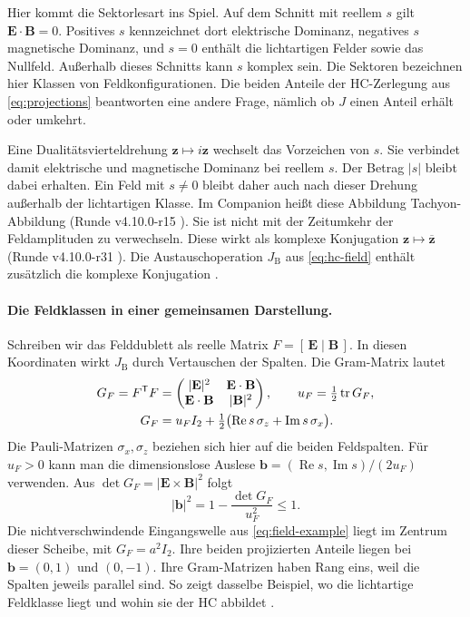 Hier kommt die Sektorlesart ins Spiel. Auf dem Schnitt mit reellem \(s\) gilt \(\mathbf E\cdot\mathbf B=0\). Positives \(s\) kennzeichnet dort elektrische Dominanz, negatives \(s\) magnetische Dominanz, und \(s=0\) enthält die lichtartigen Felder sowie das Nullfeld. Außerhalb dieses Schnitts kann \(s\) komplex sein. Die Sektoren bezeichnen hier Klassen von Feldkonfigurationen. Die beiden Anteile der HC-Zerlegung aus \eqref{eq:projections} beantworten eine andere Frage, nämlich ob \(J\) einen Anteil erhält oder umkehrt.

Eine Dualitätsvierteldrehung \(\mathbf z\mapsto i\mathbf z\) wechselt das Vorzeichen von \(s\). Sie verbindet damit elektrische und magnetische Dominanz bei reellem \(s\). Der Betrag \(|s|\) bleibt dabei erhalten. Ein Feld mit \(s\ne0\) bleibt daher auch nach dieser Drehung außerhalb der lichtartigen Klasse. Im Companion heißt diese Abbildung Tachyon-Abbildung (Runde v4.10.0-r15 \cite{companion}). Sie ist nicht mit der Zeitumkehr der Feldamplituden zu verwechseln. Diese wirkt als komplexe Konjugation \(\mathbf z\mapsto\overline{\mathbf z}\) (Runde v4.10.0-r31 \cite{layers}). Die Austauschoperation \(J_{\mathrm B}\) aus \eqref{eq:hc-field} enthält zusätzlich die komplexe Konjugation \cite{grundidee,feldsektoren}.

\paragraph{Die Feldklassen in einer gemeinsamen Darstellung.}
Schreiben wir das Felddublett als reelle Matrix \(F=[\,\mathbf E\mid\mathbf B\,]\). In diesen Koordinaten wirkt \(J_{\mathrm B}\) durch Vertauschen der Spalten. Die Gram-Matrix lautet
\begin{align}
 G_F=F^{\mathsf T}F
 &=\begin{pmatrix}
 |\mathbf E|^2 & \mathbf E\cdot\mathbf B\\
 \mathbf E\cdot\mathbf B & |\mathbf B|^2
 \end{pmatrix}, \qquad u_F=\tfrac12\operatorname{tr}G_F,\notag\\
 G_F&=u_F I_2+\tfrac12\bigl(\operatorname{Re}s\,\sigma_z+
                           \operatorname{Im}s\,\sigma_x\bigr).
 \label{eq:field-gram}
\end{align}
Die Pauli-Matrizen \(\sigma_x,\sigma_z\) beziehen sich hier auf die beiden Feldspalten. Für \(u_F>0\) kann man die dimensionslose Auslese \(\mathbf b=(\operatorname{Re}s,\operatorname{Im}s)/(2u_F)\) verwenden. Aus \(\det G_F=|\mathbf E\times\mathbf B|^2\) folgt
\begin{equation}
 |\mathbf b|^2=1-\frac{\det G_F}{u_F^2}\leq1 .
 \label{eq:field-disk-gram}
\end{equation}
Die nichtverschwindende Eingangswelle aus \eqref{eq:field-example} liegt im Zentrum dieser Scheibe, mit \(G_F=a^2 I_2\). Ihre beiden projizierten Anteile liegen bei \(\mathbf b=(0,1)\) und \((0,-1)\). Ihre Gram-Matrizen haben Rang eins, weil die Spalten jeweils parallel sind. So zeigt dasselbe Beispiel, wo die lichtartige Feldklasse liegt und wohin sie der HC abbildet \cite{feldsektoren}.

